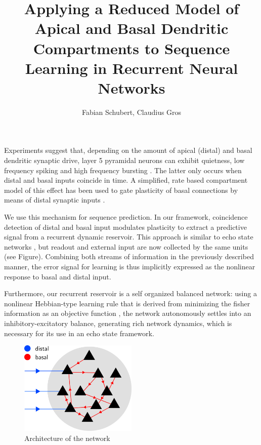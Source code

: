 \documentclass[10pt,a4paper]{article}
\author{Fabian Schubert, Claudius Gros}
\title{Applying a Reduced Model of Apical and Basal Dendritic Compartments to Sequence Learning in Recurrent Neural Networks}
\begin{document}
\maketitle

Experiments suggest that, depending on the amount of apical (distal) and basal dendritic synaptic drive, layer 5 pyramidal neurons can exhibit quietness, low frequency spiking and high frequency bursting \cite{Letzkus_2006,Shai_2015}. The latter only occurs when distal and basal inputs coincide in time. A simplified, rate based compartment model of this effect has been used to gate plasticity of basal connections by means of distal synaptic inputs \cite{Bono_2017}.

We use this mechanism for sequence prediction. In our framework, coincidence detection of distal and basal input modulates plasticity to extract a predictive signal from a recurrent dynamic reservoir. This approach is similar to echo state networks \cite{Jaeger_2010}, but readout and external input are now collected by the same units (see Figure). Combining both streams of information in the previously described manner, the error signal for learning is thus implicitly expressed as the nonlinear response to basal and distal input.

Furthermore, our recurrent reservoir is a self organized balanced network: using a nonlinear Hebbian-type learning rule that is derived from minimizing the fisher information as an objective function \cite{Echeveste_2015}, the network autonomously settles into an inhibitory-excitatory balance, generating rich network dynamics, which is necessary for its use in an echo state framework. 

\begin{figure}
\centering
\includegraphics[width=0.5\textwidth]{illustration.png}
\caption{Architecture of the network}
\end{figure}



\end{document}
